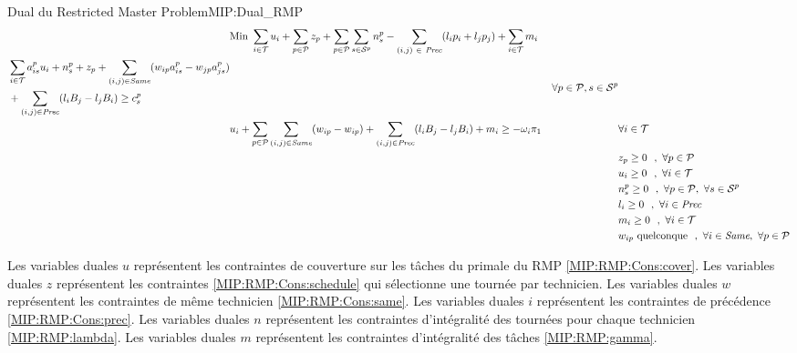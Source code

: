 \noindent
\begin{modelIP}{Dual du Restricted Master Problem}{MIP:Dual_RMP}
\small
\begin{align}
&\text{Min } \sum_{i \in \mathcal{T}}u_{i} + \sum_{p \in \mathcal{P}}z_{p} + \sum_{p \in \mathcal{P}}\sum_{s \in \mathcal{S}^{p}} n_s^p - \sum\limits_{(i,j) ~\in ~\textit{Prec}}(l_{i}p_i + l_{j}p_j)+ \sum_{i \in \mathcal{T}}m_i && \\
\begin{split}
&\sum_{i \in \mathcal{T}}a_{is}^p u_{i} + n_s^p +  z_p + \sum\limits_{(i,j) \in\textit{Same}} (w_{ip}a_{is}^p - w_{jp}a_{js}^p) \\
&+ \sum\limits_{(i,j)\in\textit{Prec}} (l_iB_j - l_jB_i) \geq c_{s}^p 
\end{split}&& \forall p \in\mathcal{P}, s \in \mathcal{S}^{p} \label{dual:reduced}\\
&u_i +  \sum_{p \in \mathcal{P}}\sum\limits_{(i,j) \in\textit{Same}} (w_{ip} - w_{ip}) + \sum\limits_{(i,j)\in\textit{Prec}} (l_iB_j - l_jB_i) + m_i \geq -\omega_i\pi_1 && \forall i \in \mathcal{T} \label{dual:revenue} \\
& && z_p \geq 0 ~~,~\forall p \in \mathcal{P} \\
& && u_i \geq 0 ~~,~\forall i \in \mathcal{T} \\
& && n_s^p \geq 0 ~~,~\forall p \in \mathcal{P},~ \forall s \in \mathcal{S}^p \\
& && l_i \geq 0 ~~,~\forall i \in \textit{Prec} \\
& && m_i \geq 0 ~~,~\forall i \in \mathcal{T} \\
& && w_{ip}\text{ quelconque}~~,~\forall i \in \textit{Same},~ \forall p \in \mathcal{P} 
\end{align}
\end{modelIP}

Les variables duales $u$ représentent les contraintes de couverture sur les tâches du primale du RMP \eqref{MIP:RMP:Cons:cover}.
Les variables duales $z$ représentent les contraintes \eqref{MIP:RMP:Cons:schedule} qui sélectionne une tournée par technicien.
Les variables duales $w$ représentent les contraintes de même technicien \eqref{MIP:RMP:Cons:same}.
Les variables duales $i$ représentent les contraintes de précédence \eqref{MIP:RMP:Cons:prec}.
Les variables duales $n$ représentent les contraintes d'intégralité des tournées pour chaque technicien \eqref{MIP:RMP:lambda}.
Les variables duales $m$ représentent les contraintes d'intégralité des tâches \eqref{MIP:RMP:gamma}.

